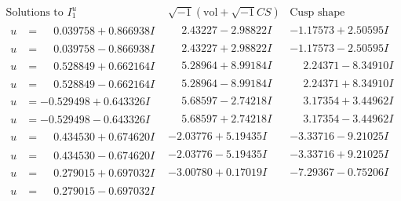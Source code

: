 \documentclass[1p]{elsarticle_modified}
\theoremstyle{definition}
\newcommand{\I}{\sqrt{-1}}
\begin{document}
$$\begin{array}{c|c|c}  
\text{Solutions to }I^u_{1}& \I (\text{vol} + \sqrt{-1}CS) & \text{Cusp shape}\\
 \hline 
\begin{aligned}
u &= \phantom{-}0.039758 + 0.866938 I\end{aligned}
 & \phantom{-}2.43227 - 2.98822 I & -1.17573 + 2.50595 I \\ \hline\begin{aligned}
u &= \phantom{-}0.039758 - 0.866938 I\end{aligned}
 & \phantom{-}2.43227 + 2.98822 I & -1.17573 - 2.50595 I \\ \hline\begin{aligned}
u &= \phantom{-}0.528849 + 0.662164 I\end{aligned}
 & \phantom{-}5.28964 + 8.99184 I & \phantom{-}2.24371 - 8.34910 I \\ \hline\begin{aligned}
u &= \phantom{-}0.528849 - 0.662164 I\end{aligned}
 & \phantom{-}5.28964 - 8.99184 I & \phantom{-}2.24371 + 8.34910 I \\ \hline\begin{aligned}
u &= -0.529498 + 0.643326 I\end{aligned}
 & \phantom{-}5.68597 - 2.74218 I & \phantom{-}3.17354 + 3.44962 I \\ \hline\begin{aligned}
u &= -0.529498 - 0.643326 I\end{aligned}
 & \phantom{-}5.68597 + 2.74218 I & \phantom{-}3.17354 - 3.44962 I \\ \hline\begin{aligned}
u &= \phantom{-}0.434530 + 0.674620 I\end{aligned}
 & -2.03776 + 5.19435 I & -3.33716 - 9.21025 I \\ \hline\begin{aligned}
u &= \phantom{-}0.434530 - 0.674620 I\end{aligned}
 & -2.03776 - 5.19435 I & -3.33716 + 9.21025 I \\ \hline\begin{aligned}
u &= \phantom{-}0.279015 + 0.697032 I\end{aligned}
 & -3.00780 + 0.17019 I & -7.29367 - 0.75206 I \\ \hline\begin{aligned}
u &= \phantom{-}0.279015 - 0.697032 I\end{aligned}

\end{array}$$
\end{document}
